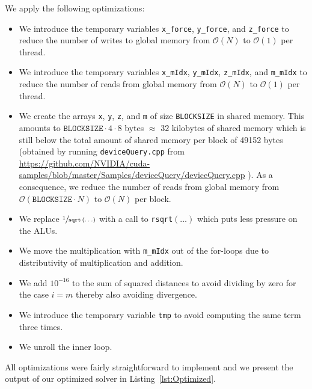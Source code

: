 \documentclass[11pt]{article}
\begin{document}
    We apply the following optimizations:
    \begin{itemize}
        \item We introduce the temporary variables \texttt{x\_force},
        \texttt{y\_force}, and \texttt{z\_force} to reduce the number of
        writes to global memory from $\mathcal{O} \left( N \right)$ to
        $\mathcal{O} \left( 1 \right)$ per thread.
        \item We introduce the temporary variables \texttt{x\_mIdx},
        \texttt{y\_mIdx}, \texttt{z\_mIdx}, and \texttt{m\_mIdx} to reduce
        the number of reads from global memory from
        $\mathcal{O} \left( N \right)$ to $\mathcal{O} \left( 1 \right)$ per
        thread.
        \item We create the arrays \texttt{x}, \texttt{y}, \texttt{z}, and
        \texttt{m} of size \texttt{BLOCKSIZE} in shared memory.
        This amounts to $\texttt{BLOCKSIZE} \cdot 4 \cdot 8$ bytes $\approx$
        $32$ kilobytes of shared memory which is still below the total amount
        of shared memory per block of 49152 bytes (obtained by running
        \texttt{deviceQuery.cpp} from
        \url{https://github.com/NVIDIA/cuda-samples/blob/master/Samples/deviceQuery/deviceQuery.cpp}
        ).
        As a consequence, we reduce the number of reads from global memory
        from $\mathcal{O} \left( \texttt{BLOCKSIZE} \cdot N \right)$ to
        $\mathcal{O} \left( N \right)$ per block.
        \item We replace $\sfrac{1}{\texttt{sqrt}\left( \ldots \right)}$ with
        a call to \texttt{rsqrt}$\left( \ldots \right)$ which puts less
        pressure on the ALUs.
        \item We move the multiplication with \texttt{m\_mIdx} out of the
        for-loops due to distributivity of multiplication and addition.
        \item We add $10^{-16}$ to the sum of squared distances to avoid
        dividing by zero for the case $i = m$ thereby also avoiding divergence.
        \item We introduce the temporary variable \texttt{tmp} to avoid
        computing the same term three times.
        \item We unroll the inner loop.
    \end{itemize}

    All optimizations were fairly straightforward to implement and we present
    the output of our optimized solver in Listing~\ref{lst:Optimized}.
\end{document}
